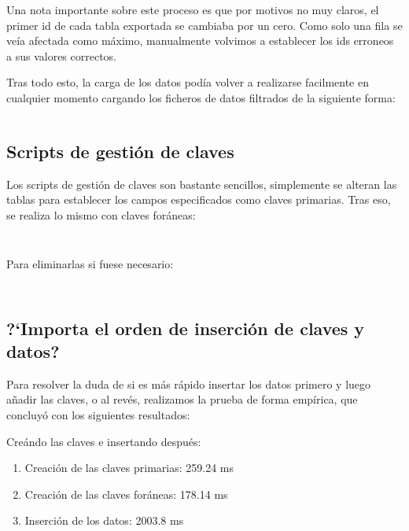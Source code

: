 \documentclass[a4paper, 11pt, oneside]{article} %
\newcommand{\scriptdir}{../scripts/} %
\begin{document}
Una nota importante sobre este proceso es que por motivos no muy claros, el primer id de cada tabla exportada se cambiaba por un cero. Como solo una fila se veía afectada como máximo, manualmente volvimos a establecer los ids erroneos a sus valores correctos.

Tras todo esto, la carga de los datos podía volver a realizarse facilmente en cualquier momento cargando los ficheros de datos filtrados de la siguiente forma:

\inputminted{mysql}{\scriptdir load_curated_data.sql}


\subsection{Scripts de gestión de claves}

Los scripts de gestión de claves son bastante sencillos, simplemente se alteran las tablas para establecer los campos especificados como claves primarias. Tras eso, se realiza lo mismo con claves foráneas:

\inputminted{mysql}{\scriptdir set_table_primary_keys.sql}

\inputminted{mysql}{\scriptdir set_table_foreign_keys.sql}

Para eliminarlas si fuese necesario:

\inputminted{mysql}{\scriptdir drop_table_primary_keys.sql}

\inputminted{mysql}{\scriptdir drop_table_foreign_keys.sql}




\subsection{?`Importa el orden de inserción de claves y datos?}

Para resolver la duda de si es más rápido insertar los datos primero y luego añadir las claves, o al revés, realizamos la prueba de forma empírica, que concluyó con los siguientes resultados:

Creándo las claves e insertando después:

\begin{enumerate}
	\item Creación de las claves primarias: 259.24 ms 
	\item Creación de las claves foráneas: 178.14 ms
	\item Inserción de los datos: 2003.8 ms
\end{enumerate}
\end{document}
